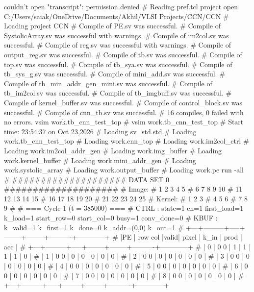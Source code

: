 couldn't open "transcript": permission denied
# Reading pref.tcl
project open {C:/Users/saiak/OneDrive/Documents/Akhil/VLSI Projects/CCN/CCN}
# Loading project CCN
# Compile of PE.sv was successful.
# Compile of SystolicArray.sv was successful with warnings.
# Compile of im2col.sv was successful.
# Compile of reg.sv was successful with warnings.
# Compile of output_reg.sv was successful.
# Compile of tb.sv was successful.
# Compile of top.sv was successful.
# Compile of tb_sya.sv was successful.
# Compile of tb_sys_g.sv was successful.
# Compile of mini_add.sv was successful.
# Compile of tb_min_addr_gen_mini.sv was successful.
# Compile of tb_im2col.sv was successful.
# Compile of tb_imgbuff.sv was successful.
# Compile of kernel_buffer.sv was successful.
# Compile of control_block.sv was successful.
# Compile of cnn_tb.sv was successful.
# 16 compiles, 0 failed with no errors.
vsim work.tb_cnn_test_top
# vsim work.tb_cnn_test_top 
# Start time: 23:54:37 on Oct 23,2026
# Loading sv_std.std
# Loading work.tb_cnn_test_top
# Loading work.cnn_top
# Loading work.im2col_ctrl
# Loading work.im2col_addr_gen
# Loading work.img_buffer
# Loading work.kernel_buffer
# Loading work.mini_addr_gen
# Loading work.systolic_array
# Loading work.output_buffer
# Loading work.pe
run -all
# 
#################### DATA SET 0 ####################
# Image:
#      1    2    3    4    5
#      6    7    8    9   10
#     11   12   13   14   15
#     16   17   18   19   20
#     21   22   23   24   25
# Kernel:
#      1    2    3
#      4    5    6
#      7    8    9
# 
# === Cycle 1  (t = 385000) ===
# CTRL : state=1 en=1 first_load=1 k_load=1 start_row=0 start_col=0 busy=1 conv_done=0
# KBUF : k_valid=1 k_first=1 k_done=0 k_addr=(0,0) k_out=1
# +---+---------+-----+--------+--------+----------+------------+
# |PE | row col |valid| pixel  |  k_in  |   prod   |    acc     |
# +---+---------+-----+--------+--------+----------+------------+
# | 0 |   0   0 |  1  |      1 |      1 |        1 |          0 |
# | 1 |   0   0 |  0  |      0 |      0 |        0 |          0 |
# | 2 |   0   0 |  0  |      0 |      0 |        0 |          0 |
# | 3 |   0   0 |  0  |      0 |      0 |        0 |          0 |
# | 4 |   0   0 |  0  |      0 |      0 |        0 |          0 |
# | 5 |   0   0 |  0  |      0 |      0 |        0 |          0 |
# | 6 |   0   0 |  0  |      0 |      0 |        0 |          0 |
# | 7 |   0   0 |  0  |      0 |      0 |        0 |          0 |
# | 8 |   0   0 |  0  |      0 |      0 |        0 |          0 |
# +---+---------+-----+--------+--------+----------+------------+
